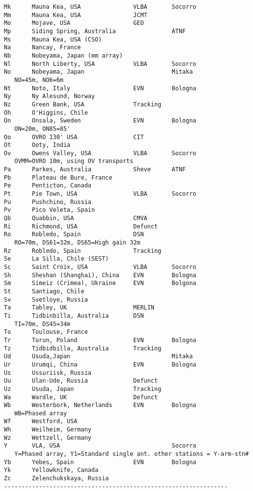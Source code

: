 \documentclass{report}
\begin{document}
\begin{verbatim}
Mk      Mauna Kea, USA               VLBA       Socorro
Mm      Mauna Kea, USA               JCMT
Mo      Mojave, USA                  GEO
Mp      Siding Spring, Australia                ATNF
Ms      Mauna Kea, USA (CSO)
Na      Nancay, France
Nb      Nobeyama, Japan (mm array)
Nl      North Liberty, USA           VLBA       Socorro
No      Nobeyama, Japan                         Mitaka
   NO=45m, NO6=6m
Nt      Noto, Italy                  EVN        Bologna
Ny      Ny Alesund, Norway
Nz      Green Bank, USA              Tracking
Oh      O'Higgins, Chile
On      Onsala, Sweden               EVN        Bologna
   ON=20m, ON85=85'
Oo      OVRO 130' USA                CIT
Ot      Ooty, India
Ov      Owens Valley, USA            VLBA       Socorro
   OVMM=OVRO 10m, using OV transports
Pa      Parkes, Australia            Sheve      ATNF
Pb      Plateau de Bure, France
Pe      Penticton, Canada
Pt      Pie Town, USA                VLBA       Socorro
Pu      Pushchino, Russia
Pv      Pico Veleta, Spain
Qb      Quabbin, USA                 CMVA
Ri      Richmond, USA                Defunct
Ro      Robledo, Spain               DSN
   RO=70m, DS61=32m, DS65=High gain 32m
Rz      Robledo, Spain               Tracking
Se      La Silla, Chile (SEST)
Sc      Saint Croix, USA             VLBA       Socorro
Sh      Sheshan (Shanghai), China    EVN        Bologna
Sm      Simeiz (Crimea), Ukraine     EVN        Bolgona
St      Santiago, Chile
Sv      Svetloye, Russia
Ta      Tabley, UK                   MERLIN
Ti      Tidbinbilla, Australia       DSN
   TI=70m, DS45=34m
To      Toulouse, France
Tr      Torun, Poland                EVN        Bologna
Tz      Tidbidbilla, Australia       Tracking
Ud      Usuda,Japan                             Mitaka
Ur      Urumqi, China                EVN        Bologna
Us      Ussuriisk, Russia
Uu      Ulan-Ude, Russia             Defunct
Uz      Usuda, Japan                 Tracking
Wa      Wardle, UK                   Defunct
Wb      Westerbork, Netherlands      EVN        Bologna
   WB=Phased array
Wf      Westford, USA
Wh      Weilheim, Germany
Wz      Wettzell, Germany
Y       VLA, USA                                Socorra
   Y=Phased array, Y1=Standard single ant. other stations = Y-arm-stn#
Yb      Yebes, Spain                 EVN        Bologna
Yk      Yellowknife, Canada
Zc      Zelenchukskaya, Russia
----------------------------------------------------------------

\end{verbatim}
\end{document}
